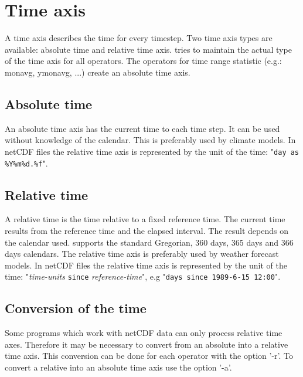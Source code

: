 \section{Time axis}

A time axis describes the time for every timestep.
Two time axis types are available: absolute time and relative time axis.
{\CDO} tries to maintain the actual type of the time axis for all operators.
The operators for time range statistic (e.g.: monavg, ymonavg, ...)
create an absolute time axis.

\subsection{Absolute time}

An absolute time axis has the current time to each time step.
It can be used without knowledge of the calendar.
This is preferably used by climate models.
In netCDF files the relative time axis is represented by the 
unit of the time: {"{\tt day as \%Y\%m\%d.\%f}"}.

\subsection{Relative time}

A relative time is the time relative to a fixed reference time.
The current time results from the reference time and the elapsed interval.
The result depends on the calendar used.
{\CDO} supports the standard Gregorian, 360 days, 365 days and 366 days calendars.
The relative time axis is preferably used by weather forecast models.
In netCDF files the relative time axis is represented by the 
unit of the time: {"{\it time-units} {\tt since} {\it reference-time}"},
e.g "{\tt days since 1989-6-15 12:00}".

\subsection{Conversion of the time}

Some programs which work with netCDF data can only process relative time axes.
Therefore it may be necessary to convert from an absolute into a relative time axis.
This conversion can be done for each operator with the {\CDO} option '-r'.
To convert a relative into an absolute time axis use the {\CDO} option '-a'.
